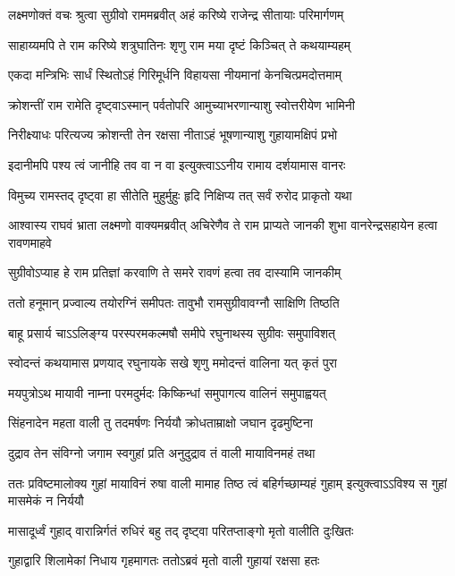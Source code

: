 \twolineshloka
{लक्ष्मणोक्तं वचः श्रुत्वा सुग्रीवो राममब्रवीत्}
{अहं करिष्ये राजेन्द्र सीतायाः परिमार्गणम्} %

\twolineshloka
{साहाय्यमपि ते राम करिष्ये शत्रुघातिनः}
{शृणु राम मया दृष्टं किञ्चित् ते कथयाम्यहम्} %

\twolineshloka
{एकदा मन्त्रिभिः सार्धं स्थितोऽहं गिरिमूर्धनि}
{विहायसा नीयमानां केनचित्प्रमदोत्तमाम्} %

\twolineshloka
{क्रोशन्तीं राम रामेति दृष्ट्वाऽस्मान् पर्वतोपरि}
{आमुच्याभरणान्याशु स्वोत्तरीयेण भामिनी} %

\twolineshloka
{निरीक्ष्याधः परित्यज्य क्रोशन्ती तेन रक्षसा}
{नीताऽहं भूषणान्याशु गुहायामक्षिपं प्रभो} %

\twolineshloka
{इदानीमपि पश्य त्वं जानीहि तव वा न वा}
{इत्युक्त्वाऽऽनीय रामाय दर्शयामास वानरः} %

\twolineshloka
{विमुच्य रामस्तद् दृष्ट्वा हा सीतेति मुहुर्मुहुः}
{हृदि निक्षिप्य तत् सर्वं रुरोद प्राकृतो यथा} %

\threelineshloka
{आश्वास्य राघवं भ्राता लक्ष्मणो वाक्यमब्रवीत्}
{अचिरेणैव ते राम प्राप्यते जानकी शुभा}
{वानरेन्द्रसहायेन हत्वा रावणमाहवे} %

\twolineshloka
{सुग्रीवोऽप्याह हे राम प्रतिज्ञां करवाणि ते}
{समरे रावणं हत्वा तव दास्यामि जानकीम्} %

\twolineshloka
{ततो हनूमान् प्रज्वाल्य तयोरग्निं समीपतः}
{तावुभौ रामसुग्रीवावग्नौ साक्षिणि तिष्ठति} %

\twolineshloka
{बाहू प्रसार्य चाऽऽलिङ्ग्य परस्परमकल्मषौ}
{समीपे रघुनाथस्य सुग्रीवः समुपाविशत्} %

\twolineshloka
{स्वोदन्तं कथयामास प्रणयाद् रघुनायके}
{सखे शृणु ममोदन्तं वालिना यत् कृतं पुरा} %

\twolineshloka
{मयपुत्रोऽथ मायावी नाम्ना परमदुर्मदः}
{किष्किन्धां समुपागत्य वालिनं समुपाह्वयत्} %

\twolineshloka
{सिंहनादेन महता वाली तु तदमर्षणः}
{निर्ययौ क्रोधताम्राक्षो जघान दृढमुष्टिना} %

\twolineshloka
{दुद्राव तेन संविग्नो जगाम स्वगुहां प्रति}
{अनुदुद्राव तं वाली मायाविनमहं तथा} %

\threelineshloka
{ततः प्रविष्टमालोक्य गुहां मायाविनं रुषा}
{वाली मामाह तिष्ठ त्वं बहिर्गच्छाम्यहं गुहाम्}
{इत्युक्त्वाऽऽविश्य स गुहां मासमेकं न निर्ययौ} %

\twolineshloka
{मासादूर्ध्वं गुहाद् वारान्निर्गतं रुधिरं बहु}
{तद् दृष्ट्वा परितप्ताङ्गो मृतो वालीति दुःखितः} %

\twolineshloka
{गुहाद्वारि शिलामेकां निधाय गृहमागतः}
{ततोऽब्रवं मृतो वाली गुहायां रक्षसा हतः} %

